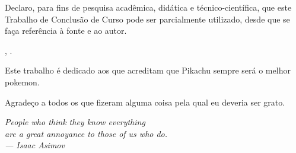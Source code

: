\documentclass[12pt,times,a4paper,english,brazil,
chapter=TITLE,section=TITLE,subsection=TITLE]{ifes7}
\begin{document}
\begin{declaracaodoautor}

  \vspace*{1.5cm}

  Declaro, para fins de pesquisa acadêmica, didática e
  técnico-científica, que este Trabalho de Conclusão de Curso pode ser
  parcialmente utilizado, desde que se faça referência à fonte e ao
  autor.

  \vspace*{2.5cm}

  \centering

  \imprimirlocal, \imprimirdata.

  \vspace*{2.5cm}

  \imprimirautor

  \vspace*{\fill}
  
\end{declaracaodoautor}


\begin{dedicatoria}
  \vspace*{\fill}
  Este trabalho é dedicado aos que acreditam que Pikachu sempre será o
  melhor pokemon.
  \vspace*{\fill}
\end{dedicatoria}


\begin{agradecimentos}
  Agradeço a todos os que fizeram alguma coisa pela qual eu deveria
  ser grato.
\end{agradecimentos}


\begin{epigrafe}
  \vspace*{\fill}
  \begin{otherlanguage}{english}
    \begin{flushright}
      \textit{People who think they know everything\\
        are a great annoyance to those of us who do.\\
        --- Isaac Asimov}
    \end{flushright}
  \end{otherlanguage}
\end{epigrafe}
\end{document}
